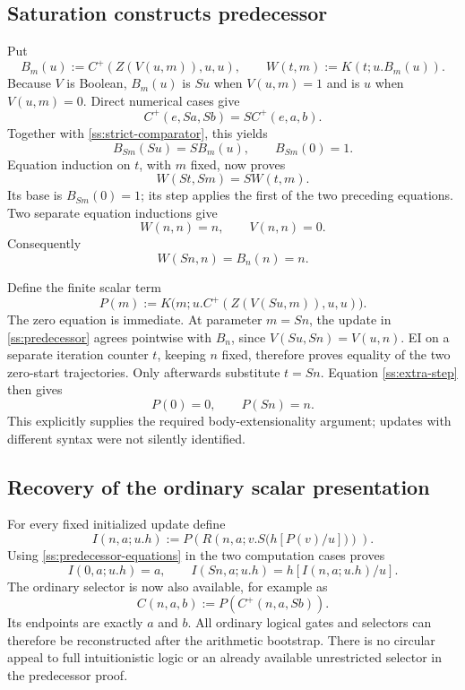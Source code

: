 \subsection{Saturation constructs predecessor}

Put
\[
 B_m(u):=C^+(Z(V(u,m)),u,u),\qquad
 W(t,m):=K(t;u.B_m(u)).
\]
Because $V$ is Boolean, $B_m(u)$ is $Su$ when $V(u,m)=1$ and is
$u$ when $V(u,m)=0$.  Direct numerical cases give
\[
 C^+(e,Sa,Sb)=S C^+(e,a,b).
\]
Together with \eqref{ss:strict-comparator}, this yields
\[
 B_{Sm}(Su)=S B_m(u),\qquad B_{Sm}(0)=1.
\]
Equation induction on $t$, with $m$ fixed, now proves
\begin{equation}
                         W(St,Sm)=S W(t,m).
 \label{ss:saturated-shift}
\end{equation}
Its base is $B_{Sm}(0)=1$; its step applies the first of the two
preceding equations.  Two separate equation inductions give
\[
                       W(n,n)=n,\qquad V(n,n)=0.
\]
Consequently
\begin{equation}
                         W(Sn,n)=B_n(n)=n.
 \label{ss:extra-step}
\end{equation}

Define the finite scalar term
\begin{equation}
 P(m):=K\bigl(m;u.C^+(Z(V(Su,m)),u,u)\bigr).
 \label{ss:predecessor}
\end{equation}
The zero equation is immediate.  At parameter $m=Sn$, the update in
\eqref{ss:predecessor} agrees pointwise with $B_n$, since
$V(Su,Sn)=V(u,n)$.  EI on a separate iteration counter $t$, keeping
$n$ fixed, therefore proves equality of the two zero-start trajectories.
Only afterwards substitute $t=Sn$.  Equation \eqref{ss:extra-step}
then gives
\begin{equation}
                         P(0)=0,\qquad P(Sn)=n.
 \label{ss:predecessor-equations}
\end{equation}
This explicitly supplies the required body-extensionality argument;
updates with different syntax were not silently identified.

\subsection{Recovery of the ordinary scalar presentation}

For every fixed initialized update define
\begin{equation}
 I(n,a;u.h):=
 P\!\left(R\left(n,a;v.S\bigl(h[P(v)/u]\bigr)\right)\right).
 \label{ss:initialized-compiler}
\end{equation}
Using \eqref{ss:predecessor-equations} in the two computation cases
proves
\[
 I(0,a;u.h)=a,\qquad
 I(Sn,a;u.h)=h[I(n,a;u.h)/u].
\]
The ordinary selector is now also available, for example as
\[
 C(n,a,b):=P(C^+(n,a,Sb)).
\]
Its endpoints are exactly $a$ and $b$.  All ordinary logical gates and
selectors can therefore be reconstructed after the arithmetic
bootstrap.  There is no circular appeal to full intuitionistic logic
or an already available unrestricted selector in the predecessor proof.

